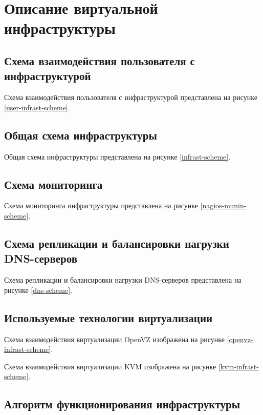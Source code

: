 \section{Описание виртуальной инфраструктуры}

\subsection{Схема взаимодействия пользователя с инфраструктурой}

Схема взаимодействия пользователя с инфраструктурой представлена на рисунке \ref{user-infrast-scheme}.

\subsection{Общая схема инфраструктуры}

Общая схема инфраструктуры представлена на рисунке \ref{infrast-scheme}.

\subsection{Схема мониторинга}

Схема мониторинга инфраструктуры представлена на рисунке \ref{nagios-munin-scheme}.

\subsection{Схема репликации и балансировки нагрузки DNS-серверов}

Схема репликации и балансировки нагрузки DNS-серверов представлена на рисунке \ref{dns-scheme}.

\subsection{Используемые технологии виртуализации}

Схема взаимодействия виртуализации OpenVZ изображена на рисунке \ref{openvz-infrast-scheme}.

Схема взаимодействия виртуализации KVM изображена на рисунке \ref{kvm-infrast-scheme}.

\subsection{Алгоритм функционирования инфраструктуры}

\clearpage
